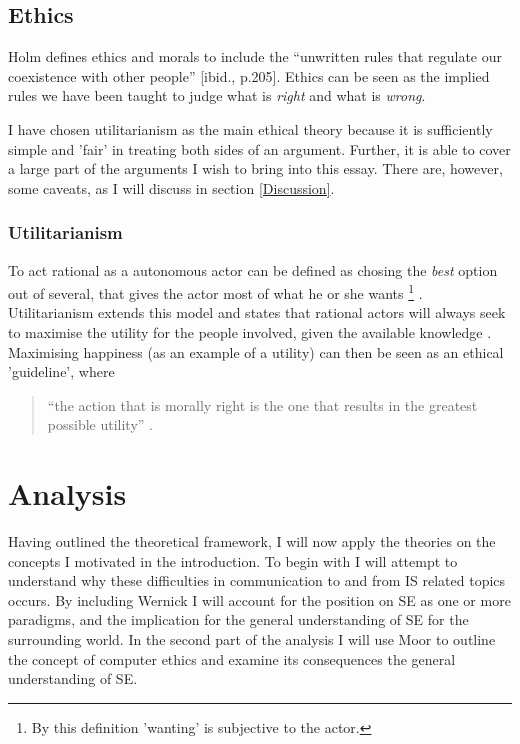 \documentclass{article}
\begin{document}
\subsection{Ethics}
Holm defines ethics and morals to include the ``unwritten rules that regulate our coexistence with other people'' [ibid., p.205]. Ethics can be seen as the implied rules we have been taught to judge what is \textit{right} and what is \textit{wrong}.

I have chosen utilitarianism as the main ethical theory because it is sufficiently simple and 'fair' in treating both sides of an argument. Further, it is able to cover a large part of the arguments I wish to bring into this essay. There are, however, some caveats, as I will discuss in section \ref{Discussion}.

\subsubsection{Utilitarianism}
To act rational as a autonomous actor can be defined as chosing the \textit{best} option out of several, that gives the actor most of what he or she wants \footnote{By this definition 'wanting' is subjective to the actor.} \citep[p. 232]{Gilje:2007}. Utilitarianism extends this model and states that rational actors will always seek to maximise the utility for the people involved, given the available knowledge \citep[p. 232]{Holm:2014, Gilje:2007}. Maximising happiness (as an example of a utility) can then be seen as an ethical 'guideline', where
\begin{quote}
``the action that is morally right is the one that results in the greatest possible utility'' \citep[p. 207]{Holm:2014}.
\end{quote}


\section{Analysis}
Having outlined the theoretical framework, I will now apply the theories on the concepts I motivated in the introduction. 
To begin with I will attempt to understand why these difficulties in communication to and from IS related topics occurs. By including Wernick I will account for the position on SE as one or more paradigms, and the implication for the general understanding of SE for the surrounding world.
In the second part of the analysis I will use Moor to outline the concept of computer ethics and examine its consequences the general understanding of SE.
\end{document}
